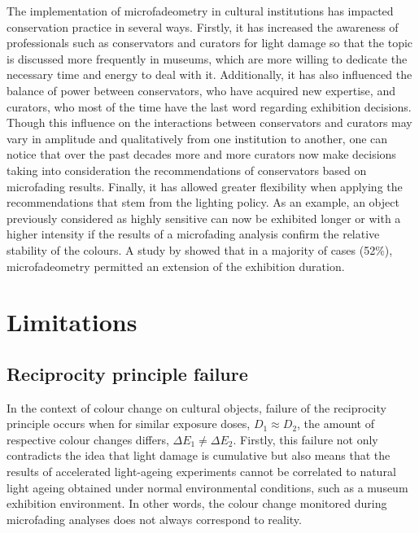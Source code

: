 The implementation of microfadeometry in cultural institutions has impacted conservation practice in several ways. Firstly, it has increased the awareness of professionals such as conservators and curators for light damage so that the topic is discussed more frequently in museums, which are more willing to dedicate the necessary time and energy to deal with it. Additionally, it has also influenced the balance of power between conservators, who have acquired new expertise, and curators, who most of the time have the last word regarding exhibition decisions. Though this influence on the interactions between conservators and curators may vary in amplitude and qualitatively from one institution to another, one can notice that over the past decades more and more curators now make decisions taking into consideration the recommendations of conservators based on microfading results. Finally, it has allowed greater flexibility when applying the recommendations that stem from the lighting policy. As an example, an object previously considered as highly sensitive can now be exhibited longer or with a higher intensity if the results of a microfading analysis confirm the relative stability of the colours. A study by \citet[163-4]{ford_protecting_2010}  showed that in a majority of cases (52\%), microfadeometry permitted an extension of the exhibition duration. \\


\newpage
\section{Limitations}

\subsection{Reciprocity principle failure}
\label{sec:RP_failure}

In the context of colour change on cultural objects, failure of the reciprocity principle occurs when for similar exposure doses, \ie $D_1 \approx D_2$, the amount of respective colour changes differs, \ie  $\Delta E_1 \neq \Delta E_2$. Firstly, this failure not only contradicts the idea that light damage is cumulative but also means that the results of accelerated light-ageing experiments cannot be correlated to natural light ageing obtained under normal environmental conditions, such as a museum exhibition environment. In other words, the colour change monitored during microfading analyses does not always correspond to reality.\\

